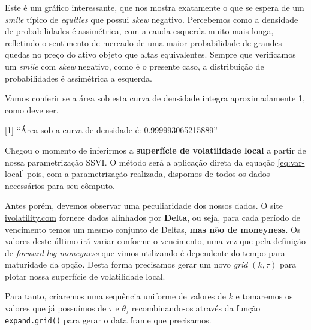 \documentclass[]{book}
\newenvironment{Shaded}{\begin{snugshade}}{\end{snugshade}}
\newcommand{\ControlFlowTok}[1]{\textcolor[rgb]{0.13,0.29,0.53}{\textbf{#1}}}
\newcommand{\DataTypeTok}[1]{\textcolor[rgb]{0.13,0.29,0.53}{#1}}
\newcommand{\DecValTok}[1]{\textcolor[rgb]{0.00,0.00,0.81}{#1}}
\newcommand{\KeywordTok}[1]{\textcolor[rgb]{0.13,0.29,0.53}{\textbf{#1}}}
\newcommand{\NormalTok}[1]{#1}
\newcommand{\OperatorTok}[1]{\textcolor[rgb]{0.81,0.36,0.00}{\textbf{#1}}}
\newcommand{\StringTok}[1]{\textcolor[rgb]{0.31,0.60,0.02}{#1}}
\theoremstyle{definition}
\theoremstyle{definition}
\theoremstyle{definition}
\theoremstyle{remark}
\begin{document}
Este é um gráfico interessante, que nos mostra exatamente o que se espera de um \emph{smile} típico de \emph{equities} que possui \emph{skew} negativo. Percebemos como a densidade de probabilidades é assimétrica, com a cauda esquerda muito mais longa, refletindo o sentimento de mercado de uma maior probabilidade de grandes quedas no preço do ativo objeto que altas equivalentes. Sempre que verificamos um \emph{smile} com \emph{skew} negativo, como é o presente caso, a distribuição de probabilidades é assimétrica a esquerda.

Vamos conferir se a área sob esta curva de densidade integra aproximadamente 1, como deve ser.

\begin{Shaded}
\end{Shaded}

{[}1{]} ``Área sob a curva de densidade é: 0.999993065215889''

Chegou o momento de inferirmos a \textbf{superfície de volatilidade local} a partir de nossa parametrização SSVI. O método será a aplicação direta da equação \eqref{eq:var-local} pois, com a parametrização realizada, dispomos de todos os dados necessários para seu cômputo.

Antes porém, devemos observar uma peculiaridade dos nossos dados. O site \href{https://ivolatility.com}{ivolatility.com} fornece dados alinhados por \textbf{Delta}, ou seja, para cada período de vencimento temos um mesmo conjunto de Deltas, \textbf{mas não de moneyness}. Os valores deste último irá variar conforme o vencimento, uma vez que pela definição de \emph{forward log-moneyness} que vimos utilizando é dependente do tempo para maturidade da opção. Desta forma precisamos gerar um novo \emph{grid} \((k, \tau)\) para plotar nossa superfície de volatilidade local.

Para tanto, criaremos uma sequência uniforme de valores de \(k\) e tomaremos os valores que já possuímos de \(\tau\) e \(\theta_\tau\) recombinando-os através da função \texttt{expand.grid()} para gerar o data frame que precisamos.
\end{document}
